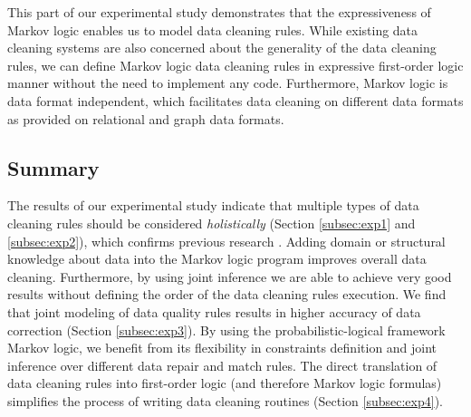 This part of our experimental study demonstrates that the expressiveness of Markov logic enables us to model data cleaning rules. While existing data cleaning systems \cite{Dallachiesa:2013:NCD:2463676.2465327} are also concerned about the generality of the data cleaning rules, we can define Markov logic data cleaning rules in expressive first-order logic manner without the need to implement any code. Furthermore, Markov logic is data format independent, which facilitates data cleaning on different data formats as provided on relational and graph data formats. 

\subsection{Summary}

The results of our experimental study indicate that multiple types of data cleaning rules should be considered \textit{holistically} (Section \ref{subsec:exp1} and \ref{subsec:exp2}), which confirms previous research \cite{Dallachiesa:2013:NCD:2463676.2465327, Fan:2014:IRM:2628135.2567657, Fan:2011:IRM:1989323.1989373}. Adding domain or structural knowledge about data into the Markov logic program improves overall data cleaning. Furthermore, by using joint inference we are able to achieve very good results without defining the order of the data cleaning rules execution. We find that joint modeling of data quality rules results in higher accuracy of data correction (Section \ref{subsec:exp3}). By using the probabilistic-logical framework Markov logic, we benefit from its flexibility in constraints definition and joint inference over different data repair and match rules. The direct translation of data cleaning rules into first-order logic (and therefore Markov logic formulas) simplifies the process of writing data cleaning routines (Section \ref{subsec:exp4}). 
